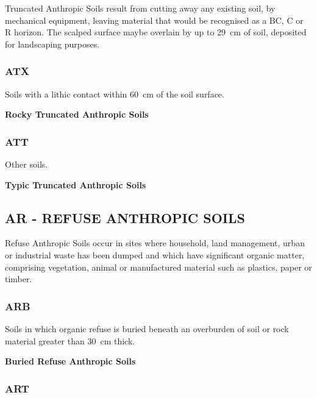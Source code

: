 \documentclass[
  letterpaper,
  DIV=11,
  numbers=noendperiod]{scrreprt}
\begin{document}
Truncated Anthropic Soils result from cutting away any existing soil, by
mechanical equipment, leaving material that would be recognised as a BC,
C or R horizon. The scalped surface maybe overlain by up to 29~cm of
soil, deposited for landscaping purposes.

\hypertarget{sec-key-ATX}{%
\subsubsection{\texorpdfstring{\textbf{ATX}}{ATX}}\label{sec-key-ATX}}

Soils with a lithic contact within 60~cm of the soil surface.

\textbf{Rocky Truncated Anthropic Soils}

\hypertarget{sec-key-ATT}{%
\subsubsection{\texorpdfstring{\textbf{ATT}}{ATT}}\label{sec-key-ATT}}

Other soils.

\textbf{Typic Truncated Anthropic Soils}

\hypertarget{sec-AR}{%
\subsection{\texorpdfstring{\textbf{AR} - REFUSE ANTHROPIC
SOILS}{AR - REFUSE ANTHROPIC SOILS}}\label{sec-AR}}

Refuse Anthropic Soils occur in sites where household, land management,
urban or industrial waste has been dumped and which have significant
organic matter, comprising vegetation, animal or manufactured material
such as plastics, paper or timber.

\hypertarget{sec-key-ARB}{%
\subsubsection{\texorpdfstring{\textbf{ARB}}{ARB}}\label{sec-key-ARB}}

Soils in which organic refuse is buried beneath an overburden of soil or
rock material greater than 30~cm thick.

\textbf{Buried Refuse Anthropic Soils}

\hypertarget{sec-key-ART}{%
\subsubsection{\texorpdfstring{\textbf{ART}}{ART}}\label{sec-key-ART}}
\end{document}
